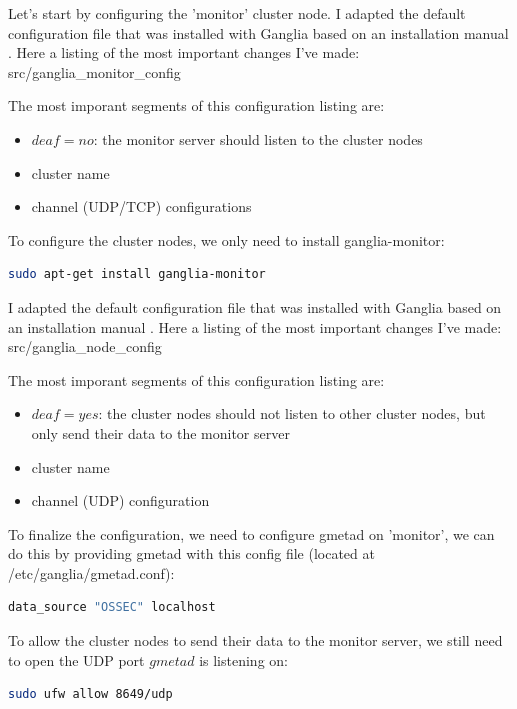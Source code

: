 \documentclass[12pt]{report}
\begin{document}
Let's start by configuring the 'monitor' cluster node. I adapted the
default configuration file that was installed with Ganglia based on an
 installation manual \cite{ganglia_install_manual}.
Here a listing of the most important changes I've made:
src/ganglia\_monitor\_config

The most imporant segments of this configuration listing are:
\begin{itemize}
\item $deaf = no$: the monitor server should listen to the cluster
  nodes
\item cluster name
\item channel (UDP/TCP) configurations
\end{itemize}

To configure the cluster nodes, we only need to install ganglia-monitor:
\begin{lstlisting}[language=bash]
sudo apt-get install ganglia-monitor
\end{lstlisting} 

I adapted the
default configuration file that was installed with Ganglia based on an
 installation manual \cite{ganglia_install_manual}.
Here a listing of the most important changes I've made:
src/ganglia\_node\_config

The most imporant segments of this configuration listing are:
\begin{itemize}
\item $deaf = yes$: the cluster nodes should not listen to other
  cluster nodes, but only send their data to the monitor server
\item cluster name
\item channel (UDP) configuration
\end{itemize}

To finalize the configuration, we need to configure gmetad on
'monitor', we can do this by providing gmetad with this config file
(located at /etc/ganglia/gmetad.conf):
\begin{lstlisting}[language=bash]
data_source "OSSEC" localhost
\end{lstlisting} 

To allow the cluster nodes to send their data to the monitor server,
we still need to open the UDP port $gmetad$ is listening on:
 \begin{lstlisting}[language=bash]
sudo ufw allow 8649/udp
\end{lstlisting} 
\end{document}
